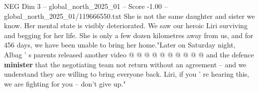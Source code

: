 \begin{textsample}{NEG Dim 3 – global\_north\_2025\_01 – Score -1.00 – global\_north\_2025\_01/119666550.txt}
She is not the same daughter and sister we know.
Her mental state is visibly deteriorated.
We saw our heroic Liri surviving and begging for her life.
She is only a few dozen kilometres away from us, and for 456 days, we have been unable to bring her home."Later on Saturday night, Albag ' s parents released another video @ @ @ @ @ @ @ @ @ @ and the defence \textbf{minister} that the negotiating team not return without an agreement -- and we understand they are willing to bring everyone back.
Liri, if you ' re hearing this, we are fighting for you -- don't give up."

\end{textsample}
